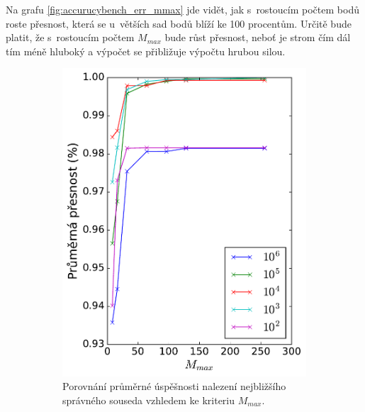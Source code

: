 Na grafu \ref{fig:accurucybench_err_mmax} jde vidět, jak s~rostoucím počtem bodů roste přesnost, která se u~větších sad bodů blíží ke 100 procentům. Určitě bude platit, že s~rostoucím počtem $M_{max}$ bude růst přesnost, neboť je strom čím dál tím méně hluboký a výpočet se přibližuje výpočtu hrubou silou. 


\begin{figure}
 
\begin{subfigure}[t]{0.49\columnwidth}
    \centering  
    \includegraphics[scale=0.6]{obrazky-figures/benchmark/accuracy/benchmark_accuracy_by_mmax.pdf}
    \caption{Porovnání průměrné úspěšnosti nalezení nejbližšího správného souseda vzhledem ke kriteriu $M_{max}$.}
\label{fig:accurucybench_acc_mmax}
\end{subfigure}
\hfill
\begin{subfigure}[t]{0.49\columnwidth}
    \centering  

\end{subfigure}
\end{figure}

